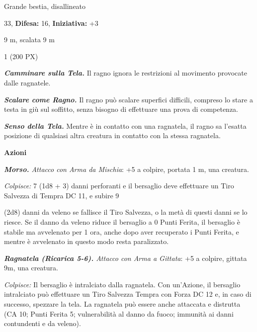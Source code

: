 \begin{multicols}{2}
{
\begin{description}[noitemsep, topsep=0pt, parsep=0pt, partopsep=0pt, leftmargin=0cm, labelwidth=2.2cm]
    \item[\textbf{Taglia/Tipo:}] Grande bestia, disallineato
    \item[\textbf{Caratt.:}] 
    \item[\textbf{Punti Ferita:}] 33,  \textbf{Difesa:} 16,  \textbf{Iniziativa:} +3
    \item[\textbf{Tiri Salvez.:}] 
    \item[\textbf{Movimento:}] 9 m, scalata 9 m
    \item[\textbf{Sfida:}] 1 (200 PX)\smallskip
\end{description}

\emph{\textbf{Camminare sulla Tela.}} Il ragno ignora le restrizioni al movimento provocate dalle ragnatele.

\emph{\textbf{Scalare come Ragno.}} Il ragno può scalare superfici difficili, compreso lo stare a testa in giù sul soffitto, senza bisogno di effettuare una prova di competenza.

\emph{\textbf{Senso della Tela.}} Mentre è in contatto con una ragnatela, il ragno sa l'esatta posizione di qualsiasi altra creatura in contatto con la stessa ragnatela.

\textbf{Azioni}

\emph{\textbf{Morso.} Attacco con Arma da Mischia}: +5 a colpire, portata 1 m, una creatura.

\emph{Colpisce:} 7 (1d8 + 3) danni perforanti e il bersaglio deve effettuare un Tiro Salvezza di Tempra DC 11, e subire 9

(2d8) danni da veleno se fallisce il Tiro Salvezza, o la metà di questi danni se lo riesce. Se il danno da veleno riduce il bersaglio a 0 Punti Ferita, il bersaglio è stabile ma avvelenato per 1 ora, anche dopo aver recuperato i Punti Ferita, e mentre è avvelenato in questo modo resta paralizzato.

\emph{\textbf{Ragnatela (Ricarica 5-6).} Attacco con Arma a Gittata}: +5 a colpire, gittata 9m, una creatura.

\emph{Colpisce:} Il bersaglio è intralciato dalla ragnatela. Con un'Azione, il bersaglio intralciato può effettuare un Tiro Salvezza Tempra con Forza DC 12 e, in caso di successo, spezzare la tela. La ragnatela può essere anche attaccata e distrutta (CA 10; Punti Ferita 5; vulnerabilità al danno da fuoco; immunità ai danni contundenti e da veleno).

}
\end{multicols}
